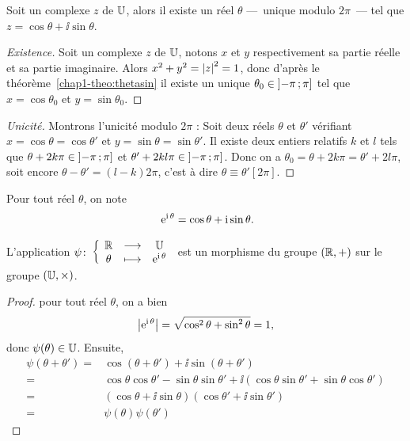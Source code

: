 %
\begin{prop}\label{prop:expsurj}
  Soit un complexe \(z\) de \(\mathbb{U}\), alors il existe un réel \(\theta\) ---~unique modulo \(2\pi\)~--- tel que \(z=\cos\theta +\ii\sin\theta\).
\end{prop}
\begin{proof}[Existence]
  Soit un complexe \(z\) de \(\mathbb{U}\), notons \(x\) et \(y\) respectivement sa partie réelle et sa partie imaginaire. Alors \(x^2+y^2=\left\lvert z\right\rvert^2=1\), donc d'après le théorème~\ref{chap1-theo:thetasin} il existe un unique \(\theta_0 \in \left] -\pi \, ;  \pi \right]\) tel que \(x=\cos\theta_0\) et \(y=\sin\theta_0\).
\end{proof}
\begin{proof}[Unicité]
  Montrons l'unicité modulo \(2\pi\) : Soit deux réels \(\theta\) et \(\theta'\) vérifiant  \(x=\cos \theta=\cos \theta'\) et \(y=\sin \theta = \sin \theta'\). Il existe deux entiers relatifs \(k\) et \(l\) tels que \(\theta +2k \pi \in \left] -\pi \, ;  \pi \right]\) et \(\theta' +2kl \pi \in \left] -\pi \, ;  \pi \right]\). Donc on a \(\theta_0=\theta + 2k \pi=\theta'+2l \pi\), soit encore \(\theta-\theta'=(l-k) 2\pi\), c'est à dire \(\theta \equiv \theta' [2\pi]\).
\end{proof}
%
\begin{defdef}
  Pour tout réel \(\theta\), on note
  \begin{equation}\
    \operatorname{e}^{\operatorname{i} \theta}=\cos\theta +\operatorname{i}\sin\theta.
  \end{equation}
\end{defdef}
%
\begin{prop}
  L'application \(\psi\colon \left\{\begin{array}{ccc} \mathbb{R} & \longrightarrow &\mathbb{U}\\ \theta & \longmapsto & \operatorname{e}^{\operatorname{i} \theta} \end{array} \right.\) est un morphisme du groupe \((\mathbb{R},+)\) sur le groupe \((\mathbb{U},\times)\).
\end{prop}
\begin{proof}
  pour tout réel \(\theta\), on a bien
  \begin{equation}
    \left\lvert\operatorname{e}^{\operatorname{i} \theta}\right\rvert=\sqrt{\cos^2 \theta + \sin^2 \theta}=1,
  \end{equation}
  donc \(\psi(\theta) \in \mathbb{U}\). Ensuite,
  \begin{align}
    \psi(\theta +\theta') = &\cos(\theta +\theta') + \ii \sin(\theta + \theta')\\
    =&\cos \theta \cos \theta' - \sin \theta \sin \theta' +\ii(\cos \theta \sin \theta' + \sin \theta \cos \theta')\\
    =&(\cos \theta + \ii \sin \theta)(\cos \theta' + \ii \sin \theta')\\
    =&\psi(\theta) \psi(\theta')
  \end{align}
\end{proof}

